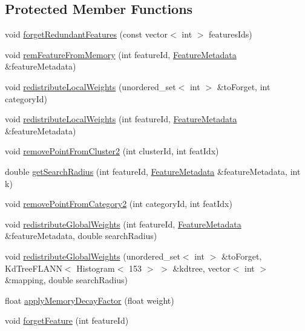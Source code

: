 \subsection*{Protected Member Functions}
\begin{DoxyCompactItemize}
\item 
void \hyperlink{class_memory_aa98d92e8d824eeb2e5699d6e1e2ff44b}{forget\+Redundant\+Features} (const vector$<$ int $>$ features\+Ids)
\item 
void \hyperlink{class_memory_ae4c5bcd99c34f0bcc62e0fcc8bac57fc}{rem\+Feature\+From\+Memory} (int feature\+Id, \hyperlink{class_feature_metadata}{Feature\+Metadata} \&feature\+Metadata)
\item 
void \hyperlink{class_memory_a1f36348fab81a50b9bbe16986b7a0337}{redistribute\+Local\+Weights} (unordered\+\_\+set$<$ int $>$ \&to\+Forget, int category\+Id)
\item 
void \hyperlink{class_memory_a53d9e1a15f774f05c68eeb1ab1042cb8}{redistribute\+Local\+Weights} (int feature\+Id, \hyperlink{class_feature_metadata}{Feature\+Metadata} \&feature\+Metadata)
\item 
void \hyperlink{class_memory_a0dbad1e7f9ae70aaf65dd733f3e6c9b9}{remove\+Point\+From\+Cluster2} (int cluster\+Id, int feat\+Idx)
\item 
double \hyperlink{class_memory_af45cd527f0c6fad40154e19b42d8fce3}{get\+Search\+Radius} (int feature\+Id, \hyperlink{class_feature_metadata}{Feature\+Metadata} \&feature\+Metadata, int k)
\item 
void \hyperlink{class_memory_ac99702a46e98175ec1b05dfd6001eaab}{remove\+Point\+From\+Category2} (int category\+Id, int feat\+Idx)
\item 
void \hyperlink{class_memory_a8b6338bb727061f8c55e0e5df04204d4}{redistribute\+Global\+Weights} (int feature\+Id, \hyperlink{class_feature_metadata}{Feature\+Metadata} \&feature\+Metadata, double search\+Radius)
\item 
void \hyperlink{class_memory_a3b697274988fa315d03015d854e3f813}{redistribute\+Global\+Weights} (unordered\+\_\+set$<$ int $>$ \&to\+Forget, Kd\+Tree\+F\+L\+A\+NN$<$ Histogram$<$ 153 $>$ $>$ \&kdtree, vector$<$ int $>$ \&mapping, double search\+Radius)
\item 
float \hyperlink{class_memory_ac31686018cb26f05d51714e057af954b}{apply\+Memory\+Decay\+Factor} (float weight)
\item 
void \hyperlink{class_memory_add3f52953d79c8ace1de5d7c667a33d1}{forget\+Feature} (int feature\+Id)
\end{DoxyCompactItemize}
